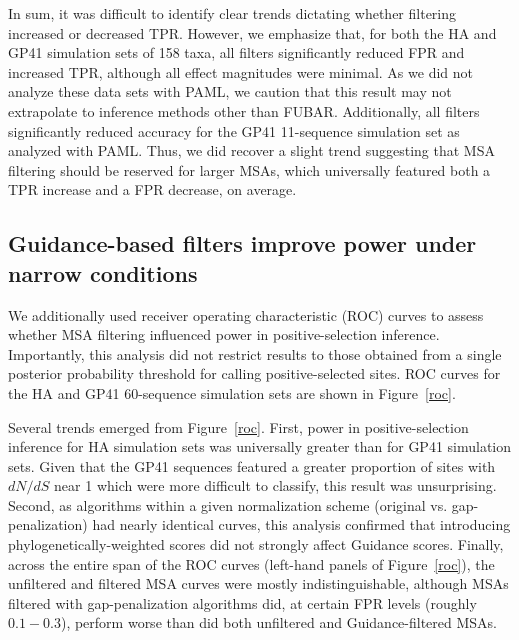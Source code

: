 \documentclass[11pt]{article}
\begin{document}
In sum, it was difficult to identify clear trends dictating whether filtering increased or decreased TPR. However, we emphasize that, for both the HA and GP41 simulation sets of 158 taxa, all filters significantly reduced FPR and increased TPR, although all effect magnitudes were minimal. As we did not analyze these data sets with PAML, we caution that this result may not extrapolate to inference methods other than FUBAR. Additionally, all filters significantly reduced accuracy for the GP41 11-sequence simulation set as analyzed with PAML. Thus, we did recover a slight trend suggesting that MSA filtering should be reserved for larger MSAs, which universally featured both a TPR increase and a FPR decrease, on average.

\subsection*{Guidance-based filters improve power under narrow conditions}

We additionally used receiver operating characteristic (ROC) curves to assess whether MSA filtering influenced power in positive-selection inference. Importantly, this analysis did not restrict results to those obtained from a single posterior probability threshold for calling positive-selected sites. ROC curves for the HA and GP41 60-sequence simulation sets are shown in Figure~\ref{roc}. 

Several trends emerged from Figure~\ref{roc}. First, power in positive-selection inference for HA simulation sets was universally greater than for GP41 simulation sets. Given that the GP41 sequences featured a greater proportion of sites with $dN/dS$ near 1 which were more difficult to classify, this result was unsurprising. Second, as algorithms within a given normalization scheme (original vs. gap-penalization) had nearly identical curves, this analysis confirmed that introducing phylogenetically-weighted scores did not strongly affect Guidance scores. Finally, across the entire span of the ROC curves (left-hand panels of Figure~\ref{roc}), the unfiltered and filtered MSA curves were mostly indistinguishable, although MSAs filtered with gap-penalization algorithms did, at certain FPR levels (roughly $0.1-0.3$), perform worse than did both unfiltered and Guidance-filtered MSAs. 
\end{document}
